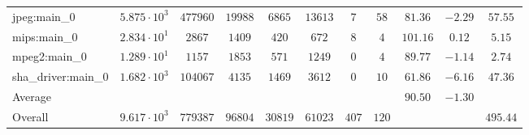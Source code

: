 \begin{tabular}{|l|c|c|c|c|c|c|c|c|c|c|}
jpeg:main\_0            & $ 5.875 \cdot 10^{3} $ & $ 477960 $ & $ 19988 $ & $ 6865  $ & $ 13613 $ & $ 7   $ & $ 58  $ & $ 81.36       $ & $ -2.29   $ & $ 57.55   $ \\
mips:main\_0            & $ 2.834 \cdot 10^{1} $ & $ 2867   $ & $ 1409  $ & $ 420   $ & $ 672   $ & $ 8   $ & $ 4   $ & $ 101.16      $ & $ 0.12    $ & $ 5.15    $ \\
mpeg2:main\_0           & $ 1.289 \cdot 10^{1} $ & $ 1157   $ & $ 1853  $ & $ 571   $ & $ 1249  $ & $ 0   $ & $ 4   $ & $ 89.77       $ & $ -1.14   $ & $ 2.74    $ \\
sha\_driver:main\_0     & $ 1.682 \cdot 10^{3} $ & $ 104067 $ & $ 4135  $ & $ 1469  $ & $ 3612  $ & $ 0   $ & $ 10  $ & $ 61.86       $ & $ -6.16   $ & $ 47.36   $ \\
\hline
Average                 & $                    $ & $        $ & $       $ & $       $ & $       $ & $     $ & $     $ & $ 90.50       $ & $ -1.30   $ & $         $ \\
\hline
Overall                 & $ 9.617 \cdot 10^{3} $ & $ 779387 $ & $ 96804 $ & $ 30819 $ & $ 61023 $ & $ 407 $ & $ 120 $ & $             $ & $         $ & $ 495.44  $ \\
\hline
\end{tabular}
